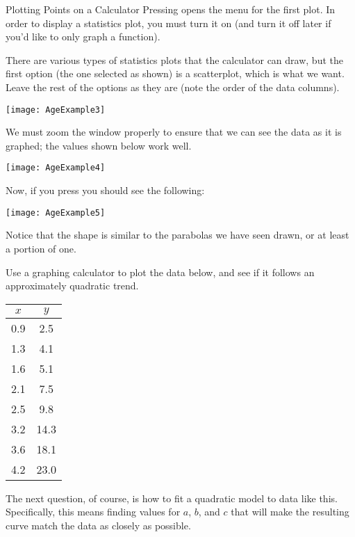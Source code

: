\begin{example}{Plotting Points on a Calculator}
Pressing  opens the menu for the first plot.  In order to display a statistics plot, you must turn it on (and turn it off later if you'd like to only graph a function).
\pagebreak

There are various types of statistics plots that the calculator can draw, but the first option (the one selected as shown) is a scatterplot, which is what we want.  Leave the rest of the options as they are (note the order of the data columns).

\begin{center}
\texttt{[image: AgeExample3]}
\end{center}

We must zoom the window properly to ensure that we can see the data as it is graphed; the values shown below work well.

\begin{center}
\texttt{[image: AgeExample4]}
\end{center}

Now, if you press  you should see the following:

\begin{center}
\texttt{[image: AgeExample5]}
\end{center}

Notice that the shape is similar to the parabolas we have seen drawn, or at least a portion of one.
\end{example}

\begin{try}
Use a graphing calculator to plot the data below, and see if it follows an approximately quadratic trend.
\begin{center}
\begin{tabular}{c c}
$x$ & $y$\\
\hline
0.9 & 2.5\\
1.3 & 4.1\\
1.6 & 5.1\\
2.1 & 7.5\\
2.5 & 9.8\\
3.2 & 14.3\\
3.6 & 18.1\\
4.2 & 23.0
\end{tabular}
\end{center}
\end{try}

The next question, of course, is how to fit a quadratic model to data like this.  Specifically, this means finding values for $a$, $b$, and $c$ that will make the resulting curve match the data as closely as possible.

